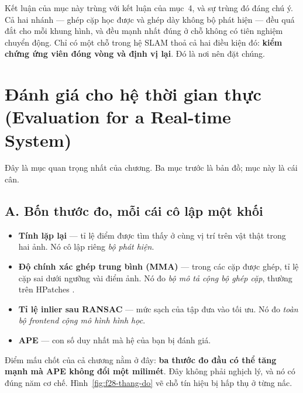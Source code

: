 \documentclass[../../deep_learning.tex]{subfiles}
\begin{document}
Kết luận của mục này trùng với kết luận của mục~4, và sự trùng đó đáng chú ý. Cả hai nhánh --- ghép cặp học được và ghép dày không bộ phát hiện --- đều quá đắt cho mỗi khung hình, và đều mạnh nhất đúng ở chỗ không có tiên nghiệm chuyển động. Chỉ có một chỗ trong hệ SLAM thoả cả hai điều kiện đó: \textbf{kiểm chứng ứng viên đóng vòng và định vị lại}. Đó là nơi nên đặt chúng.


\section{Đánh giá cho hệ thời gian thực (Evaluation for a Real-time System)}
Đây là mục quan trọng nhất của chương. Ba mục trước là bản đồ; mục này là cái cân.

\subsection{A. Bốn thước đo, mỗi cái cô lập một khối}
\begin{itemize}
\item \textbf{Tính lặp lại} --- tỉ lệ điểm được tìm thấy ở cùng vị trí trên vật thật trong hai ảnh. Nó cô lập riêng \emph{bộ phát hiện}.
\item \textbf{Độ chính xác ghép trung bình (MMA)} --- trong các cặp được ghép, tỉ lệ cặp sai dưới ngưỡng vài điểm ảnh. Nó đo \emph{bộ mô tả cộng bộ ghép cặp}, thường trên HPatches \cite{balntas2017hpatches}.
\item \textbf{Tỉ lệ inlier sau RANSAC} --- mức sạch của tập đưa vào tối ưu. Nó đo \emph{toàn bộ frontend cộng mô hình hình học}.
\item \textbf{APE} --- con số duy nhất mà hệ của bạn bị đánh giá.
\end{itemize}

Điểm mấu chốt của cả chương nằm ở đây: \textbf{ba thước đo đầu có thể tăng mạnh mà APE không đổi một milimét}. Đây không phải nghịch lý, và nó có đúng năm cơ chế. Hình~\ref{fig:f28-thang-do} vẽ chỗ tín hiệu bị hấp thụ ở từng nấc.
\end{document}
